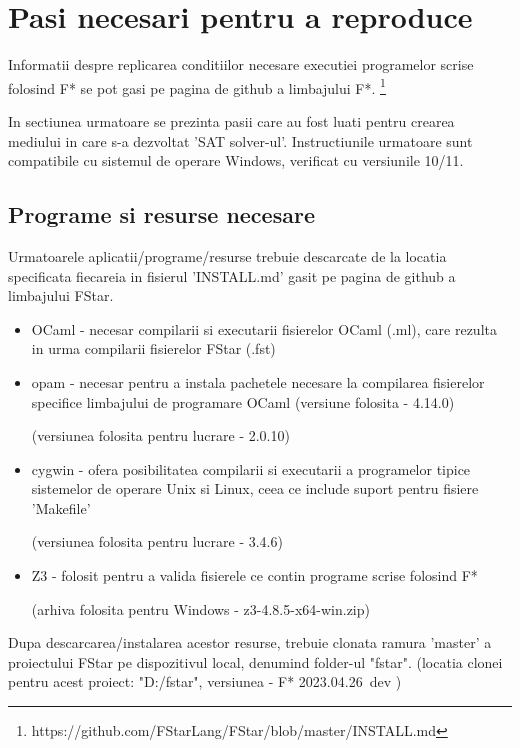 \chapter{Pasi necesari pentru a reproduce}

Informatii despre replicarea conditiilor necesare executiei programelor scrise folosind F* se pot gasi pe pagina de github a limbajului F*. \footnote{https://github.com/FStarLang/FStar/blob/master/INSTALL.md}

In sectiunea urmatoare se prezinta pasii care au fost luati pentru crearea mediului in care s-a dezvoltat 'SAT solver-ul'. Instructiunile urmatoare sunt compatibile cu sistemul de operare Windows, verificat cu versiunile 10/11. 

\section{Programe si resurse necesare}

Urmatoarele aplicatii/programe/resurse trebuie descarcate de la locatia specificata fiecareia in fisierul 'INSTALL.md' gasit pe pagina de github a limbajului FStar.

\begin{itemize}
 \item OCaml - necesar compilarii si executarii fisierelor OCaml (.ml), care rezulta in urma compilarii fisierelor FStar (.fst)
	
 \item opam - necesar pentru a instala pachetele necesare la compilarea fisierelor specifice limbajului de programare OCaml (versiune folosita - 4.14.0)
 
 (versiunea folosita pentru lucrare - 2.0.10)
 \item cygwin - ofera posibilitatea compilarii si executarii a programelor tipice sistemelor de operare Unix si Linux, ceea ce include suport pentru fisiere 'Makefile' 
 
 (versiunea folosita pentru lucrare - 3.4.6)
 \item Z3 - folosit pentru a valida fisierele ce contin programe scrise folosind F*
 

 
 (arhiva folosita pentru Windows - z3-4.8.5-x64-win.zip)
\end{itemize}

\newpage


Dupa descarcarea/instalarea acestor resurse, trebuie clonata ramura 'master' a proiectului FStar pe dispozitivul local, denumind folder-ul "fstar". (locatia clonei pentru acest proiect: "D:/fstar", versiunea  - F* 2023.04.26~dev )

